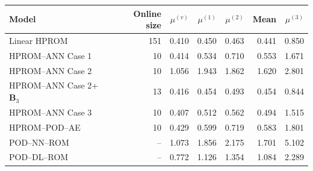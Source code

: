 \begin{tabular}{lr|rrrr|r}
\toprule
Model & Online size & $\mu^{(v)}$ & $\mu^{(1)}$ & $\mu^{(2)}$ & Mean & $\mu^{(3)}$ \\
\midrule
Linear HPROM & 151 & 0.410 & 0.450 & 0.463 & 0.441 & 0.850 \\
HPROM--ANN Case 1 & 10 & 0.414 & 0.534 & 0.710 & 0.553 & 1.671 \\
HPROM--ANN Case 2 & 10 & 1.056 & 1.943 & 1.862 & 1.620 & 2.801 \\
HPROM--ANN Case 2+$\mathbf B_3$ & 13 & 0.416 & 0.454 & 0.493 & 0.454 & 0.844 \\
HPROM--ANN Case 3 & 10 & 0.407 & 0.512 & 0.562 & 0.494 & 1.515 \\
HPROM--POD--AE & 10 & 0.429 & 0.599 & 0.719 & 0.583 & 1.801 \\
\midrule
POD--NN--ROM & -- & 1.073 & 1.856 & 2.175 & 1.701 & 5.102 \\
POD--DL--ROM & -- & 0.772 & 1.126 & 1.354 & 1.084 & 2.289 \\
\bottomrule
\end{tabular}
